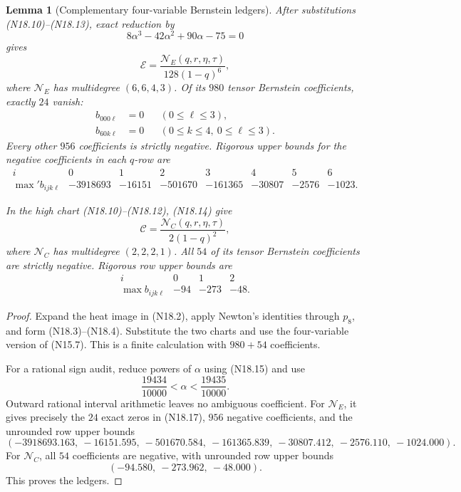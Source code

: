 \documentclass[11pt]{article}
\newtheorem{lemma}[theorem]{Lemma}
\theoremstyle{definition}
\theoremstyle{remark}
\begin{document}
\begin{lemma}[Complementary four-variable Bernstein ledgers]
\label{lem:f2v18-complementary}
After substitutions
\textup{(N18.10)}--\textup{(N18.13)}, exact reduction by
\[
 8\alpha^3-42\alpha^2+90\alpha-75=0
 \tag{N18.15}
\]
gives
\[
 \mathcal E=
 \frac{\mathcal N_E(q,r,\eta,\tau)}
      {128(1-q)^6},
 \tag{N18.16}
\]
where \(\mathcal N_E\) has multidegree \((6,6,4,3)\).
Of its \(980\) tensor Bernstein coefficients, exactly \(24\) vanish:
\[
\begin{aligned}
 b_{000\ell}&=0 &&(0\leq\ell\leq3),\\
 b_{60k\ell}&=0 &&(0\leq k\leq4,\ 0\leq\ell\leq3).
\end{aligned}
\tag{N18.17}
\]
Every other \(956\) coefficients is strictly negative.  Rigorous upper
bounds for the negative coefficients in each \(q\)-row are
\[
\begin{array}{c|rrrrrrr}
 i&0&1&2&3&4&5&6\\ \hline
 \max{}'b_{ijk\ell}
 &-3918693&-16151&-501670&-161365&-30807&-2576&-1023.
\end{array}
\tag{N18.18}
\]

In the high chart
\textup{(N18.10)}--\textup{(N18.12)}, \textup{(N18.14)} give
\[
 \mathcal C=
 \frac{\mathcal N_C(q,r,\eta,\tau)}
      {2(1-q)^2},
 \tag{N18.19}
\]
where \(\mathcal N_C\) has multidegree \((2,2,2,1)\).
All \(54\) of its tensor Bernstein coefficients are strictly negative.
Rigorous row upper bounds are
\[
\begin{array}{c|rrr}
 i&0&1&2\\ \hline
 \max b_{ijk\ell}&-94&-273&-48.
\end{array}
\tag{N18.20}
\]
\end{lemma}

\begin{proof}
Expand the heat image in \textup{(N18.2)}, apply Newton's identities through
\(p_8\), and form \textup{(N18.3)}--\textup{(N18.4)}.  Substitute the two
charts and use the four-variable version of
\textup{(N15.7)}.  This is a finite calculation with \(980+54\)
coefficients.

For a rational sign audit, reduce powers of \(\alpha\) using
\textup{(N18.15)} and use
\[
 \frac{19434}{10000}<\alpha<\frac{19435}{10000}.
 \tag{N18.21}
\]
Outward rational interval arithmetic leaves no ambiguous coefficient.
For \(\mathcal N_E\), it gives precisely the \(24\) exact zeros in
\textup{(N18.17)}, \(956\) negative coefficients, and the unrounded row
upper bounds
\[
 (-3918693.163,\ -16151.595,\ -501670.584,\ -161365.839,\
  -30807.412,\ -2576.110,\ -1024.000).
 \tag{N18.22}
\]
For \(\mathcal N_C\), all \(54\) coefficients are negative, with unrounded
row upper bounds
\[
 (-94.580,\ -273.962,\ -48.000).
 \tag{N18.23}
\]
This proves the ledgers.
\end{proof}
\end{document}

